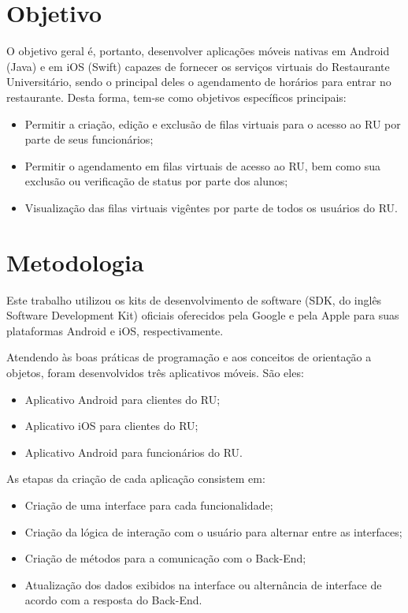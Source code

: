 \section{Objetivo}
O objetivo geral é, portanto, desenvolver aplicações móveis nativas em Android (Java) e em iOS (Swift) 
capazes de fornecer os serviços virtuais do Restaurante Universitário, sendo o principal deles
o agendamento de horários para entrar no restaurante. Desta forma, tem-se como objetivos específicos 
principais: 
\begin{itemize}
\setlength\itemsep{0em}
\item Permitir a criação, edição e exclusão de filas virtuais para o acesso ao RU por parte de seus funcionários; 
\item Permitir o agendamento em filas virtuais de acesso ao RU, bem como sua exclusão ou verificação de 
status por parte dos alunos;
\item Visualização das filas virtuais vigêntes por parte de todos os usuários do RU.
\end{itemize}

\section{Metodologia}
Este trabalho utilizou os kits de desenvolvimento de software (SDK, do inglês Software Development 
Kit) oficiais oferecidos pela Google e pela Apple para suas plataformas Android e iOS, respectivamente.

Atendendo às boas práticas de programação e aos conceitos de orientação a objetos,
foram desenvolvidos três aplicativos móveis. São eles:
\begin{itemize}
\setlength\itemsep{0em}
\item Aplicativo Android para clientes do RU;
\item Aplicativo iOS para clientes do RU;
\item Aplicativo Android para funcionários do RU.
\end{itemize}

As etapas da criação de cada aplicação consistem em:
\begin{itemize}
\setlength\itemsep{0em}
\item Criação de uma interface para cada funcionalidade;
\item Criação da lógica de interação com o usuário para alternar entre as 
interfaces;
\item Criação de métodos para a comunicação com o Back-End;
\item Atualização dos dados exibidos na interface ou alternância de interface
 de acordo com a resposta do Back-End.
\end{itemize}

